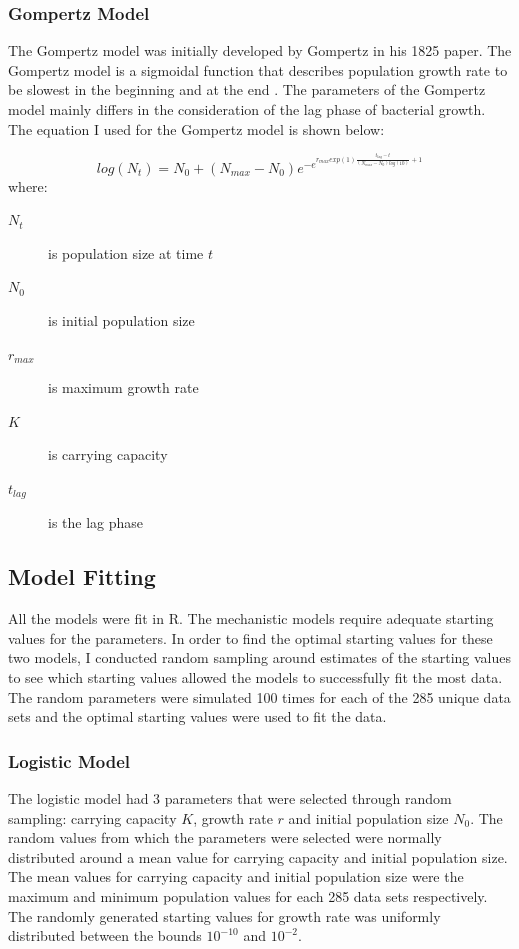 \documentclass[11pt]{article}
\begin{document}
    \subsubsection{Gompertz Model}
    The Gompertz model was initially developed by Gompertz in his 1825 paper. The Gompertz model is a sigmoidal function that describes population growth rate to be slowest in the beginning and at the end \citep{gompertz1825xxiv}. The parameters of the Gompertz model mainly differs in the consideration of the lag phase of bacterial growth. The equation I used for the Gompertz model is shown below:
   
    \[log(N_t)= N_0 + (N_{max} - N_0)e^{-e^{r_{max}exp(1)\frac {t_{lag}-t}{(N_{max}-N_0)log(10)}+1}}\]
    where:
    \begin{description}
    \item[$N_{t}$] is population size at time $t$
    \item[$N_{0}$] is initial population size
    \item[$r_{max}$] is maximum growth rate
    \item[$K$] is carrying capacity
    \item[$t_{lag}$] is the lag phase
    \end{description}
    
    \subsection{Model Fitting}
    All the models were fit in R. The mechanistic models require adequate starting values for the parameters. In order to find the optimal starting values for these two models, I conducted random sampling around estimates of the starting values to see which starting values allowed the models to successfully fit the most data. The random parameters were simulated 100 times for each of the 285 unique data sets and the optimal starting values were used to fit the data.
    
    \subsubsection{Logistic Model}
    The logistic model had 3 parameters that were selected through random sampling: carrying capacity $K$, growth rate $r$ and initial population size $N_0$. The random values from which the parameters were selected were normally distributed around a mean value for carrying capacity and initial population size. The mean values for carrying capacity and initial population size were the maximum and minimum population values for each 285 data sets respectively. The randomly generated starting values for growth rate was uniformly distributed between the bounds $10^{-10}$ and $10^{-2}$.
    
\end{document}
